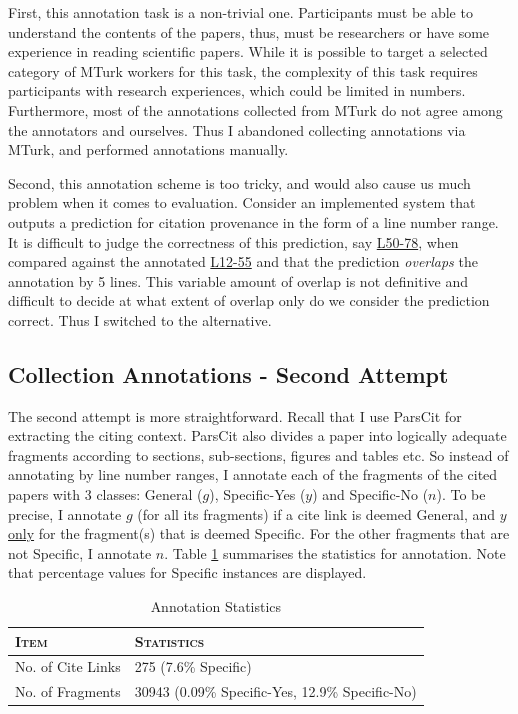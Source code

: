 First, this annotation task is a non-trivial one. Participants must be able to understand the contents of the papers, thus, must be researchers or have some experience in reading scientific papers. While it is possible to target a selected category of MTurk workers for this task, the complexity of this task requires participants with research experiences, which could be limited in numbers. Furthermore, most of the annotations collected from MTurk do not agree among the annotators and ourselves. Thus I abandoned collecting annotations via MTurk, and performed annotations manually.

Second, this annotation scheme is too tricky, and would also cause us much problem when it comes to evaluation. Consider an implemented system that outputs a prediction for citation provenance in the form of a line number range. It is difficult to judge the correctness of this prediction, say \url{L50-78}, when compared against the annotated \url{L12-55} and that the prediction \textit{overlaps} the annotation by 5 lines. This variable amount of overlap is not definitive and difficult to decide at what extent of overlap only do we consider the prediction correct. Thus I switched to the alternative.

\subsection{Collection Annotations - Second Attempt}
The second attempt is more straightforward. Recall that I use ParsCit for extracting the citing context. ParsCit also divides a paper into logically adequate fragments according to sections, sub-sections, figures and tables etc. So instead of annotating by line number ranges, I annotate each of the fragments of the cited papers with 3 classes: General ($g$), Specific-Yes ($y$) and Specific-No ($n$). To be precise, I annotate $g$ (for all its fragments) if a cite link is deemed General, and $y$ \underline{only} for the fragment(s) that is deemed Specific. For the other fragments that are not Specific, I annotate $n$. Table \ref{tab:annotation} summarises the statistics for annotation. Note that percentage values for Specific instances are displayed.

\begin{table}[h]
	\center
	\begin{tabular}{ l | l}
		\textsc{Item} & \textsc{Statistics}\\
		\hline
		No. of Cite Links & 275 (7.6\% Specific) \\
		No. of Fragments & 30943 (0.09\% Specific-Yes, 12.9\% Specific-No)
	\end{tabular}
	\caption{Annotation Statistics}
	\label{tab:annotation}
\end{table}

